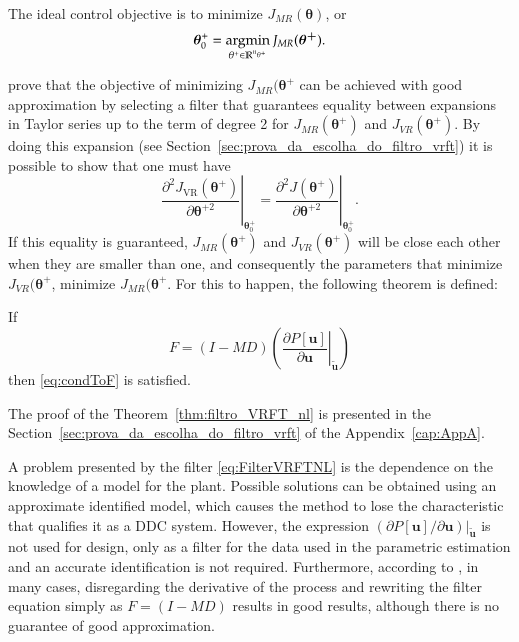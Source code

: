 The ideal control objective is to minimize $J_{MR}(\bm{\theta})$, or
\begin{equation}
   \bm{\theta}^+_0 = \operatorname*{argmin}_{\theta^+ \in \mathbb{R}^{n_{\theta^+}}}{J_{MR}(\bm{\theta^+})}.
\label{eq:argmqp}
\end{equation}

\cite{campi2006} prove that the objective of minimizing $J_{MR}(\bm{\theta^+}$ can be achieved with good approximation by selecting a filter that guarantees equality between expansions in Taylor series up to the term of degree 2 for $J_{MR}(\bm{\theta^+})$ and $J_{VR}(\bm{\theta}^+)$. By doing this expansion (see Section~\ref{sec:prova_da_escolha_do_filtro_vrft}) it is possible to show that one must have
\begin{equation}
   \left.\frac{\partial^{2} J_{\mathrm{VR}}\left(\bm{\theta}^+\right)}{\partial \bm{\theta}^{+2}}\right|_{\bm{\theta}_{0}^{+}}=\left.\frac{\partial^{2} J\left(\bm{\theta}^+\right)}{\partial \bm{\theta}^{+2}}\right|_{\bm{\theta}_{0}^{+}}.
   \label{eq:condToF}
\end{equation}
If this equality is guaranteed, $J_{MR}(\bm{\theta^+})$ and $J_{VR}(\bm{\theta^+})$ will be close each other when they are smaller than one, and consequently the parameters that minimize $J_{VR}(\bm{\theta^+}$, minimize $J_{MR}(\bm{\theta^+}$. For this to happen, the following theorem is defined:
\begin{thm} \label{thm:filtro_VRFT_nl}
   If
   \begin{equation}
       F=(I-M D)\left(\left.\frac{\partial P[\bm{u}]}{\partial \bm{u}}\right|_{\tilde{\bm{u}}}\right)
       \label{eq:FilterVRFTNL}
   \end{equation}
   then \eqref{eq:condToF} is satisfied.
\end{thm}

The proof of the Theorem~\ref{thm:filtro_VRFT_nl} is presented in the Section~\ref{sec:prova_da_escolha_do_filtro_vrft} of the Appendix~\ref{cap:AppA}.

A problem presented by the filter \eqref{eq:FilterVRFTNL} is the dependence on the knowledge of a model for the plant. Possible solutions can be obtained using an approximate identified model, which causes the method to lose the characteristic that qualifies it as a DDC system. However, the expression $\left.(\partial P[\bm{u}]/\partial \bm{u})\right|_{\tilde{\bm{u}}}$ is not used for design, only as a filter for the data used in the parametric estimation and an accurate identification is not required.
Furthermore, according to \cite{campi2006}, in many cases, disregarding the derivative of the process and rewriting the filter equation simply as $F=(I-MD)$ results in good results, although there is no guarantee of good approximation.
   
